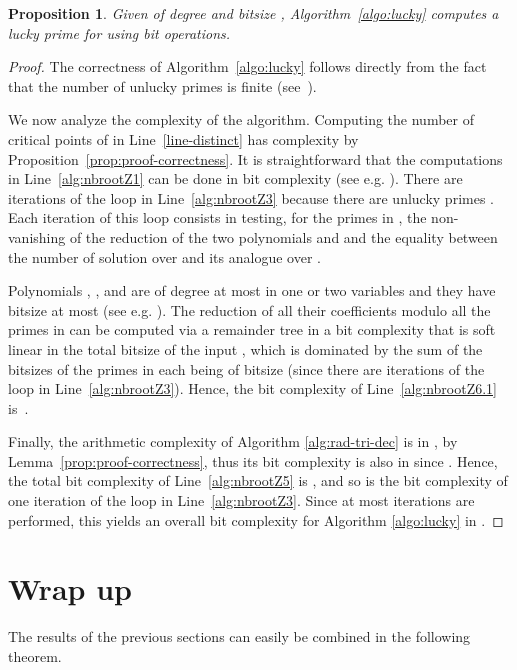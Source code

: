 \documentclass{sig-alternate}
\newtheorem{proposition}[theorem]{Proposition}
\newcommand{\blue}[1]{\color{blue}#1\color{black}\xspace}
\renewcommand{\blue}[1]{#1\xspace}
\begin{document}
\begin{proposition}\label{prop:comp-lucky}
Given  of degree  and bitsize , 
Algorithm~\ref{algo:lucky} computes a lucky prime  for  using  bit operations.
\end{proposition}
\begin{proof}
The correctness of Algorithm~\ref{algo:lucky} follows directly from the fact that the number of unlucky primes is finite 
(see~\blue{\cite[Prop. 13]{bouzidiJSC2014a}}). 

We now analyze the complexity of the algorithm. Computing the number of critical points of
 in Line~\ref{line-distinct} has complexity  by
Proposition~\ref{prop:proof-correctness}.
It is
straightforward that the computations in Line~\ref{alg:nbrootZ1} can be done in bit complexity
 (see e.g. \blue{\cite[Lemma 7]{bouzidiJSC2014a}}). There are \blue{} iterations of the loop in Line~\ref{alg:nbrootZ3} because there are
 unlucky primes \blue{\cite[Prop. 13]{bouzidiJSC2014a}}. Each iteration of this loop consists in testing, for
the  
primes in , the non-vanishing of the reduction of the two polynomials
 and  and the equality between the number of
solution over  and its analogue over .



Polynomials , ,  and  are of degree at most  in one or two variables and
they have bitsize at most  (see e.g. \blue{\cite[Lemma 7]{bouzidiJSC2014a}}).
The reduction of all their  coefficients modulo all the primes in  can be computed via a remainder tree in a bit
  complexity that is soft linear in the total bitsize of the input
\cite[Thm. 1]{moenck1974}, which is dominated by the sum of the
    bitsizes of the  primes 
 in  each being of bitsize
     \blue{} (since there are \blue{} iterations of the loop in Line~\ref{alg:nbrootZ3}). Hence, the bit complexity of  Line~\ref{alg:nbrootZ6.1} is~.

Finally, the arithmetic complexity of
     Algorithm \ref{alg:rad-tri-dec} is in , 
by Lemma~\ref{prop:proof-correctness},  thus its bit complexity is also in 
     since \blue{}.  Hence, the total bit complexity of Line~\ref{alg:nbrootZ5} is
     , and so is the bit complexity of one iteration of the loop in
     Line~\ref{alg:nbrootZ3}. Since at most \blue{} iterations are performed, this yields an
     overall bit complexity for Algorithm \ref{algo:lucky} in .
\end{proof}


\section{Wrap up}
The results of the previous sections can easily be combined in the following theorem.
\end{document}

